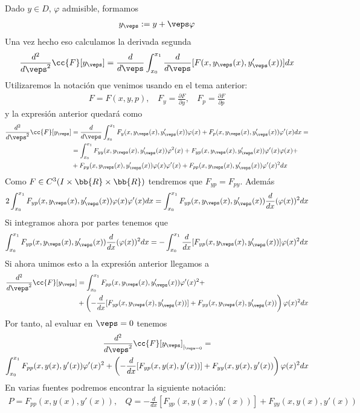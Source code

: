 Dado $y\in D$, $\varphi$ admisible, formamos
\begin{gather*}
    y_\veps := y +\veps \varphi
\end{gather*}
Una vez hecho eso calculamos la derivada segunda
\begin{gather*}
    \frac{d^2}{d\veps^2}\cc{F}[y_\veps] = \frac{d}{d\veps} \int_{x_0}^{x_1} \frac{d}{d\veps} [F(x, y_\veps(x), y_\veps'(x))] dx
\end{gather*}
Utilizaremos la notación que venimos usando en el tema anterior:
\begin{gather*}
    F=F(x,y,p),\ \ \ \ F_y=\frac{\partial F}{\partial y},\ \ \ \ F_p = \frac{\partial F}{\partial p}
\end{gather*}
y la expresión anterior quedará como 
\begin{align*}
    \frac{d^2}{d\veps^2}\cc{F}[y_\veps] &= \frac{d}{d\veps} \int_{x_0}^{x_1} F_y(x,y_\veps(x), y_\veps'(x))\varphi(x) + F_p(x,y_\veps(x), y_\veps'(x))\varphi'(x)dx = \\
    &= \int_{x_0}^{x_1} F_{yy}(x,y_\veps(x), y_\veps'(x)) \varphi^2(x) + F_{yp}(x,y_\veps(x), y_\veps'(x))\varphi'(x)\varphi(x) + \\
    &+ F_{py}(x,y_\veps(x), y_\veps'(x))\varphi(x)\varphi'(x) + F_{pp}(x,y_\veps(x), y_\veps'(x))\varphi'(x)^2 dx
\end{align*}
Como $F\in C^3(I\times \bb{R} \times \bb{R})$ tendremos que $F_{yp}=F_{py}$. Además
\begin{gather*}
    2\int_{x_0}^{x_1} F_{yp}(x,y_\veps(x), y_\veps'(x)) \varphi(x)\varphi'(x) dx = \int_{x_0}^{x_1} F_{yp}(x,y_\veps(x), y_\veps'(x)) \frac{d}{dx}(\varphi(x))^2 dx
\end{gather*}
Si integramos ahora por partes tenemos que 
\begin{gather*}
    \int_{x_0}^{x_1} F_{yp}(x,y_\veps(x), y_\veps'(x)) \frac{d}{dx}(\varphi(x))^2 dx = -\int_{x_0}^{x_1} \frac{d}{dx} [F_{yp}(x,y_\veps(x), y_\veps'(x))] \varphi(x)^2 dx
\end{gather*}
Si ahora unimos esto a la expresión anterior llegamos a 
\begin{align*}
    \frac{d^2}{d\veps^2}\cc{F}[y_\veps] &= \int_{x_0}^{x_1} F_{pp}(x,y_\veps(x), y_\veps'(x)) \varphi'(x)^2 +\\
    &+ \left(-\frac{d}{dx}[F_{yp}(x,y_\veps(x), y_\veps'(x)) ] + F_{yy}(x,y_\veps(x), y_\veps'(x))\right)\varphi(x)^2 dx
\end{align*}
Por tanto, al evaluar en $\veps = 0$ tenemos
\begin{gather*}
    \frac{d^2}{d\veps^2}\cc{F}[y_\veps]_{|_{\veps=0}} =\\
    \int_{x_0}^{x_1} F_{pp}(x,y(x), y'(x)) \varphi'(x)^2 + \left(-\frac{d}{dx}[F_{yp}(x,y(x), y'(x)) ] + F_{yy}(x,y(x), y'(x))\right)\varphi(x)^2 dx
\end{gather*}
En varias fuentes podremos encontrar la siguiente notación:
\begin{gather*}
    P = F_{pp}(x,y(x), y'(x)),\ \ \ \ Q = -\frac{d}{dx}[F_{yp}(x,y(x), y'(x)) ] + F_{yy}(x,y(x), y'(x))
\end{gather*}

